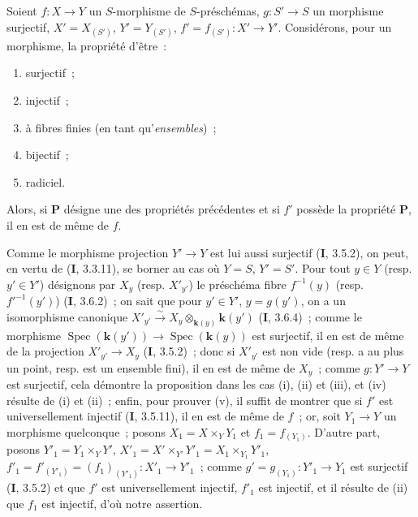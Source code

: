 \begin{proposition}[2.6.1]
Soient $f:X\to Y$ un $S$-morphisme de $S$-préschémas, $g:S'\to S$ un
morphisme surjectif, $X'=X_{(S')}$, $Y'=Y_{(S')}$,
$f'=f_{(S')}:X'\to Y'$. Considérons, pour un morphisme, la propriété d'être~:
\begin{enumerate}
\item[\textup{(i)}] surjectif~;
\item[\textup{(ii)}] injectif~;
\item[\textup{(iii)}] à fibres finies \textup{(en tant qu'\emph{ensembles})}~;
\item[\textup{(iv)}] bijectif~;
\item[\textup{(v)}] radiciel.
\end{enumerate}
Alors, si $\boldsymbol{P}$ désigne une des propriétés précédentes et si $f'$ possède la
propriété $\boldsymbol{P}$, il en est de même de $f$.
\end{proposition}

Comme le morphisme projection $Y'\to Y$ est lui aussi surjectif (\textbf{I}, 3.5.2),
on peut, en vertu de (\textbf{I}, 3.3.11), se borner au cas où $Y=S$, $Y'=S'$. Pour
tout $y\in Y$ (resp. $y'\in Y'$) désignons par $X_y$ (resp. $X'_{y'}$) le
préschéma fibre $f^{-1}(y)$ (resp. $f'^{-1}(y')$) (\textbf{I}, 3.6.2)~; on sait que
pour $y'\in Y'$, $y=g(y')$, on a un isomorphisme canonique $X'_{y'}\xrightarrow{\sim}X_y\otimes_{\mathbf{k}(y)}\boldsymbol{k}(y')$ (\textbf{I}, 3.6.4)~;
comme le morphisme $\operatorname{Spec}(\boldsymbol{k}(y'))\to\operatorname{Spec}(\boldsymbol{k}(y))$
est surjectif, il en est de même de la projection $X'_{y'}\to X_y$
(\textbf{I}, 3.5.2)~; donc si $X'_{y'}$ est non vide (resp. a au plus un point, resp.
est un ensemble fini), il en est de même de $X_y$~; comme $g:Y'\to Y$ est
surjectif, cela démontre la proposition dans les cas (i), (ii) et (iii), et
(iv) résulte de (i) et (ii)~; enfin, pour prouver (v), il suffit de montrer
que si $f'$ est universellement injectif (\textbf{I}, 3.5.11), il en est de même de
$f$~; or, soit $Y_1\to Y$ un morphisme quelconque~; posons
$X_1=X\times_Y Y_1$ et $f_1=f_{(Y_1)}$. D'autre part, posons $Y'_1=Y_1\times_Y Y'$, $X'_1=X'\times_{Y'}Y'_1=X_1\times_{Y_1}Y'_1$, $f'_1=f'_{(Y'_1)}=(f_1)_{(Y'_1)}:X'_1\to Y'_1$~;
comme $g'=g_{(Y_1)}:Y'_1\to Y_1$ est surjectif (\textbf{I}, 3.5.2) et que $f'$ est
universellement injectif, $f'_1$ est injectif, et il résulte de (ii) que
$f_1$ est injectif, d'où notre assertion.


